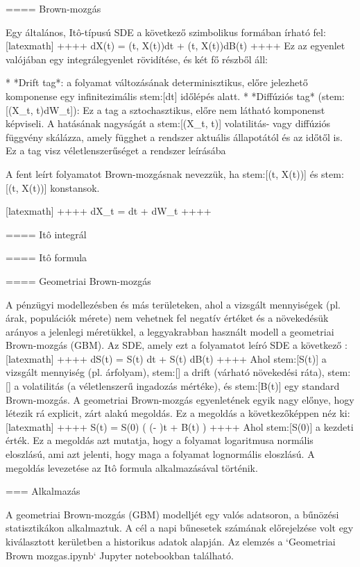 \documentclass[11pt]{article}
\begin{document}
==== Brown-mozgás

Egy általános, Itô-típusú SDE a következő szimbolikus formában írható fel:
[latexmath]
++++
dX(t) = \mu(t, X(t))dt + \sigma(t, X(t))dB(t)
++++
Ez az egyenlet valójában egy integrálegyenlet rövidítése, és két fő részből áll:

* *Drift tag*: a folyamat változásának determinisztikus, előre jelezhető komponense egy infinitezimális stem:[dt] időlépés alatt.
* *Diffúziós tag* (stem:[\sigma(X_t, t)dW_t]): Ez a tag a sztochasztikus, előre nem látható komponenst képviseli. A hatásának nagyságát a stem:[\sigma(X_t, t)] volatilitás- vagy diffúziós függvény skálázza, amely függhet a rendszer aktuális állapotától és az időtől is. Ez a tag visz véletlenszerűséget a rendszer leírásába

A fent leírt folyamatot Brown-mozgásnak nevezzük, ha stem:[\mu(t, X(t))] és stem:[\sigma(t, X(t))] konstansok.


[latexmath]
++++
dX_t = \mu dt + \sigma dW_t
++++


==== Itô integrál

==== Itô formula

==== Geometriai Brown-mozgás

A pénzügyi modellezésben és más területeken, ahol a vizsgált mennyiségek (pl. árak, populációk mérete) nem vehetnek fel negatív értéket és a növekedésük arányos a jelenlegi méretükkel, a leggyakrabban használt modell a geometriai Brown-mozgás (GBM).
Az SDE, amely ezt a folyamatot leíró SDE a következő :
[latexmath]
++++
dS(t) = \mu S(t) dt + \sigma S(t) dB(t)
++++
Ahol stem:[S(t)] a vizsgált mennyiség (pl. árfolyam), stem:[\mu] a drift (várható növekedési ráta), stem:[\sigma] a volatilitás (a véletlenszerű ingadozás mértéke), és stem:[B(t)] egy standard Brown-mozgás.
A geometriai Brown-mozgás egyenletének egyik nagy előnye, hogy létezik rá explicit, zárt alakú megoldás.
Ez a megoldás a következőképpen néz ki:
[latexmath]
++++
S(t) = S(0) \exp\left( \left(\mu - \right)t + \sigma B(t) \right)
++++
Ahol stem:[S(0)] a kezdeti érték.
Ez a megoldás azt mutatja, hogy a folyamat logaritmusa normális eloszlású, ami azt jelenti, hogy maga a folyamat lognormális eloszlású.
A megoldás levezetése az Itô formula alkalmazásával történik.




=== Alkalmazás

A geometriai Brown-mozgás (GBM) modelljét egy valós adatsoron, a bűnözési statisztikákon alkalmaztuk. A cél a napi bűnesetek számának előrejelzése volt egy kiválasztott kerületben a historikus adatok alapján. Az elemzés a `Geometriai Brown mozgas.ipynb` Jupyter notebookban található.
\end{document}
